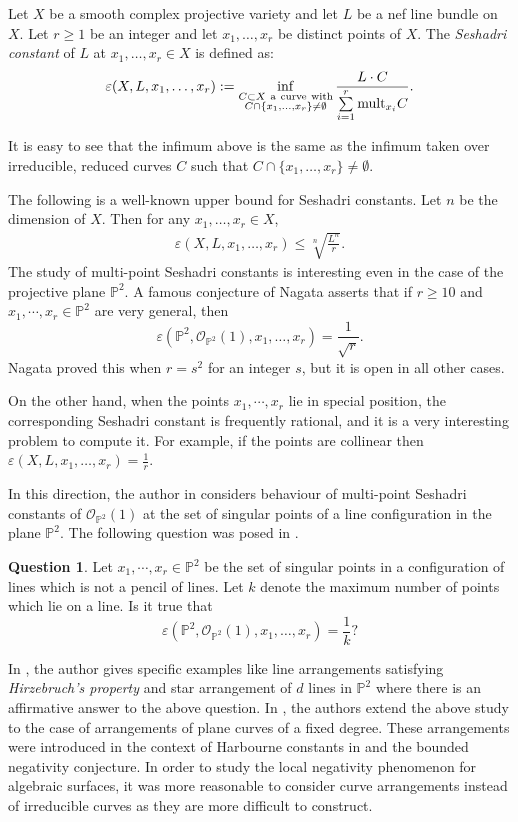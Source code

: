 \documentclass[12pt,reqno]{amsart}
\theoremstyle{plain}
\numberwithin{equation}{section}
\theoremstyle{definition}
\newtheorem{question}[theorem]{Question}
\begin{document}
	Let $X$ be a smooth complex projective variety and let $L$ be a nef line bundle on
	$X$. Let $r \ge 1$ be an integer and let $x_1,\ldots,x_r$ be distinct
	points of $X$.
	The {\it Seshadri constant} of $L$ at $x_1,\ldots,x_r \in X$ is defined as: 
	$$\varepsilon(X,L,x_1,\ldots,x_r):=  \inf\limits_{\substack{C \subset
			X{\rm ~a~ curve~ with} \\C \cap \{x_1,\ldots,x_r\}
			\ne \emptyset}} \frac{L\cdot C}{\sum\limits_{i=1}^r {\rm
			mult}_{x_i}C}.$$ 
	
	It is easy to see that the infimum above is the same as the infimum taken over
	irreducible, reduced curves $C$ such that $C \cap \{x_1,\ldots,x_r\}
	\ne \emptyset$.
	
	The following is a  well-known upper bound for Seshadri
	constants. 
	Let $n$ be the dimension of $X$. Then for
	any $x_1,\ldots,x_r \in X$, 
	\begin{eqnarray*}\label{wellknown}
		\varepsilon(X,L,x_1,\ldots,x_r) \le
		\sqrt[n]{\frac{L^n}{r}}.
	\end{eqnarray*}
	The study of multi-point Seshadri constants is interesting even in the case of the projective plane $\mathbb{P}^2.$ A famous conjecture of Nagata asserts that if $r \geq 10$ and $x_1,\cdots, x_r \in \mathbb{P}^2 $ are very general, then 
	$$\varepsilon(\mathbb{P}^2,\mathcal{O}_{\mathbb{P}^2}(1),x_1,\ldots,x_r)= \frac{1}{\sqrt{r}}.$$ 
	Nagata \cite{Nag} proved this when $r=s^2$ for an integer $s$, but it is open in all other cases. 
	
	On the other hand, when the points $x_1, \cdots, x_r$ lie in special position, the corresponding  Seshadri constant is frequently rational, and it is a very interesting problem to compute it. For example, if the points are collinear then 
	$\varepsilon(X,L,x_1,\ldots,x_r) = \frac{1}{r}$. 
	
	In this direction, the author in \cite{Pok} considers behaviour of multi-point Seshadri constants  
	of $\mathcal{O}_{\mathbb{P}^2}(1)$ at the 
	set of singular points  of a line configuration in the plane $\mathbb{P}^2.$  The following 
	question was posed in \cite{Pok}. 
	
		\begin{question}\label{qn1}
		Let $x_1, \cdots, x_r \in \mathbb{P}^2$ be the set of singular points in a configuration of lines  which is not a pencil of lines. Let $k$ denote the maximum number of points which lie on a line. Is it true that 
		$$\varepsilon(\mathbb{P}^2,\mathcal{O}_{\mathbb{P}^2}(1),x_1,\ldots,x_r)= \frac{1}{k} ? $$
	\end{question}
	In \cite{Pok}, the author gives specific examples like line arrangements satisfying \textit{Hirzebruch's property} and star arrangement of $d$ lines in $\mathbb{P}^2$ where there is an affirmative answer to the above question. 
	In \cite{JP}, the authors extend the above study to the case of arrangements of plane curves of a fixed degree. These arrangements were introduced in the context of Harbourne constants in \cite{PRS} and the bounded negativity conjecture. In order to study the  local negativity phenomenon for algebraic surfaces, it was more reasonable to consider curve arrangements instead of irreducible curves as they are more difficult to construct.  
	
\end{document}
